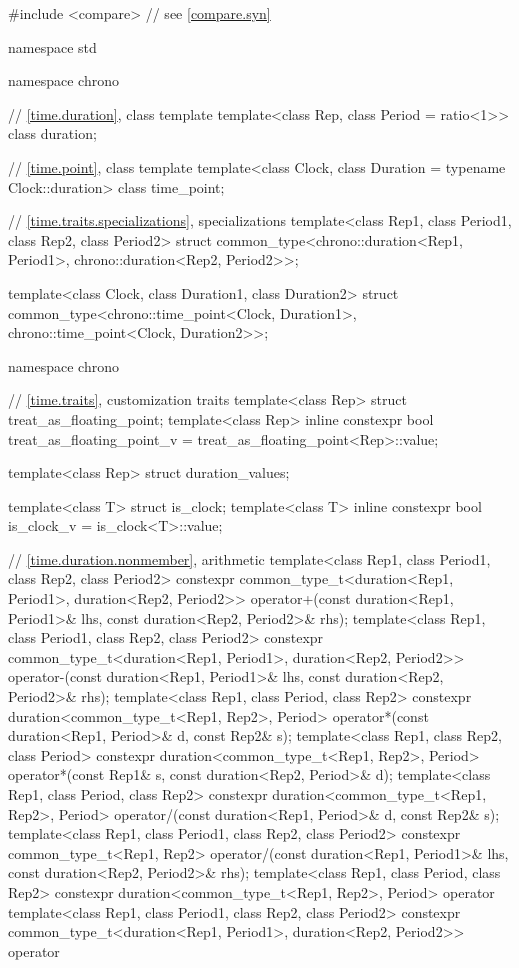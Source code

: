 \begin{codeblock}
#include <compare>              // see \ref{compare.syn}

namespace std {
  namespace chrono {
    // \ref{time.duration}, class template 
    template<class Rep, class Period = ratio<1>> class duration;

    // \ref{time.point}, class template 
    template<class Clock, class Duration = typename Clock::duration> class time_point;
  }

  // \ref{time.traits.specializations},  specializations
  template<class Rep1, class Period1, class Rep2, class Period2>
    struct common_type<chrono::duration<Rep1, Period1>,
                       chrono::duration<Rep2, Period2>>;

  template<class Clock, class Duration1, class Duration2>
    struct common_type<chrono::time_point<Clock, Duration1>,
                       chrono::time_point<Clock, Duration2>>;

  namespace chrono {
    // \ref{time.traits}, customization traits
    template<class Rep> struct treat_as_floating_point;
    template<class Rep>
      inline constexpr bool treat_as_floating_point_v = treat_as_floating_point<Rep>::value;

    template<class Rep> struct duration_values;

    template<class T> struct is_clock;
    template<class T> inline constexpr bool is_clock_v = is_clock<T>::value;

    // \ref{time.duration.nonmember},  arithmetic
    template<class Rep1, class Period1, class Rep2, class Period2>
      constexpr common_type_t<duration<Rep1, Period1>, duration<Rep2, Period2>>
        operator+(const duration<Rep1, Period1>& lhs, const duration<Rep2, Period2>& rhs);
    template<class Rep1, class Period1, class Rep2, class Period2>
      constexpr common_type_t<duration<Rep1, Period1>, duration<Rep2, Period2>>
        operator-(const duration<Rep1, Period1>& lhs, const duration<Rep2, Period2>& rhs);
    template<class Rep1, class Period, class Rep2>
      constexpr duration<common_type_t<Rep1, Rep2>, Period>
        operator*(const duration<Rep1, Period>& d, const Rep2& s);
    template<class Rep1, class Rep2, class Period>
      constexpr duration<common_type_t<Rep1, Rep2>, Period>
        operator*(const Rep1& s, const duration<Rep2, Period>& d);
    template<class Rep1, class Period, class Rep2>
      constexpr duration<common_type_t<Rep1, Rep2>, Period>
        operator/(const duration<Rep1, Period>& d, const Rep2& s);
    template<class Rep1, class Period1, class Rep2, class Period2>
      constexpr common_type_t<Rep1, Rep2>
        operator/(const duration<Rep1, Period1>& lhs, const duration<Rep2, Period2>& rhs);
    template<class Rep1, class Period, class Rep2>
      constexpr duration<common_type_t<Rep1, Rep2>, Period>
        operator%
    template<class Rep1, class Period1, class Rep2, class Period2>
      constexpr common_type_t<duration<Rep1, Period1>, duration<Rep2, Period2>>
        operator%

}}
\end{codeblock}
